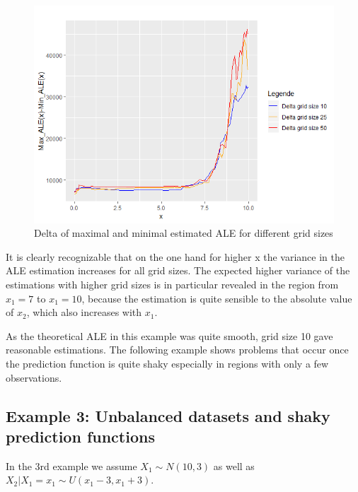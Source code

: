 \documentclass[]{krantz}
\begin{document}
\begin{figure}
\includegraphics[width=1\linewidth]{images/ALE_2_example2.1_delta_} \caption{Delta of maximal and minimal estimated ALE for
different grid sizes}\label{fig:exampleALE2c}
\end{figure}




It is clearly recognizable that on the one hand for higher x the
variance in the ALE estimation increases for all grid sizes. The
expected higher variance of the estimations with higher grid sizes is in
particular revealed in the region from \(x_1 = 7\) to \(x_1 = 10\),
because the estimation is quite sensible to the absolute value of
\(x_2\), which also increases with \(x_1\).

As the theoretical ALE in this example was quite smooth, grid size 10
gave reasonable estimations. The following example shows problems that
occur once the prediction function is quite shaky especially in regions
with only a few observations.

\subsection{Example 3: Unbalanced datasets and shaky prediction
functions}\label{example-3-unbalanced-datasets-and-shaky-prediction-functions}

In the 3rd example we assume \(X_1 \sim N(10,3)\) as well as\\
\(X_2 \vert X_1 = x_1 \sim U(x_1 - 3, x_1 + 3 )\).
\end{document}
